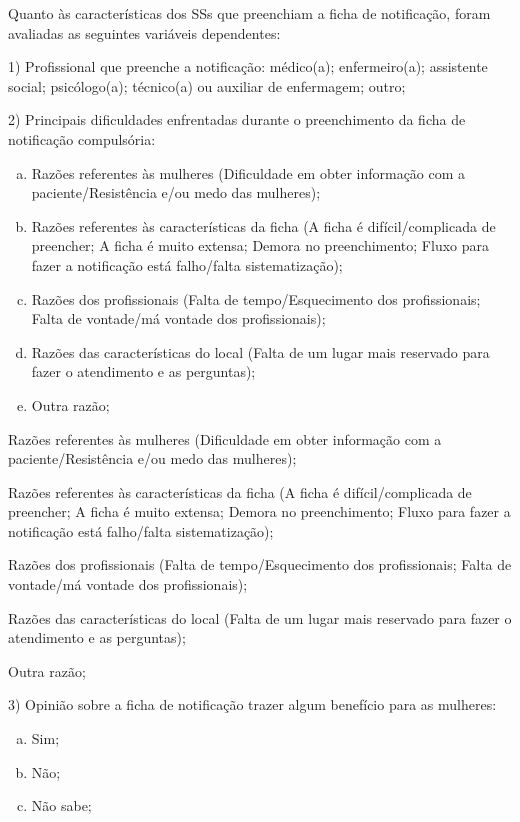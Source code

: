 \documentclass{article}
\begin{document}
Quanto às características dos SSs que preenchiam a ficha de notificação, foram
avaliadas as seguintes variáveis dependentes:

1) Profissional que preenche a notificação: médico(a); enfermeiro(a); assistente
social; psicólogo(a); técnico(a) ou auxiliar de enfermagem; outro;

2) Principais dificuldades enfrentadas durante o preenchimento da ficha de
notificação compulsória:

\begin{enumerate}[a)]
\item
Razões referentes às mulheres (Dificuldade em obter informação com a
paciente/Resistência e/ou medo das mulheres);

\item
Razões referentes às características da ficha (A ficha é difícil/complicada de
preencher; A ficha é muito extensa; Demora no preenchimento; Fluxo para fazer a
notificação está falho/falta sistematização);

\item
Razões dos profissionais (Falta de tempo/Esquecimento dos profissionais; Falta
de vontade/má vontade dos profissionais);

\item
Razões das características do local (Falta de um lugar mais reservado para fazer
o atendimento e as perguntas);

\item
Outra razão;

\end{enumerate}

Razões referentes às mulheres (Dificuldade em obter informação com a
paciente/Resistência e/ou medo das mulheres);

Razões referentes às características da ficha (A ficha é difícil/complicada de
preencher; A ficha é muito extensa; Demora no preenchimento; Fluxo para fazer a
notificação está falho/falta sistematização);

Razões dos profissionais (Falta de tempo/Esquecimento dos profissionais; Falta
de vontade/má vontade dos profissionais);

Razões das características do local (Falta de um lugar mais reservado para fazer
o atendimento e as perguntas);

Outra razão;

3) Opinião sobre a ficha de notificação trazer algum benefício para as mulheres:

\begin{enumerate}[a)]
\item
Sim;

\item
Não;

\item
Não sabe;

\end{enumerate}
\end{document}
